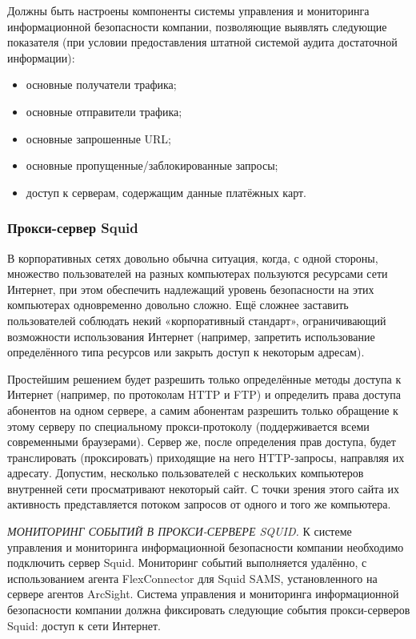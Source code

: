 Должны быть настроены компоненты системы управления и мониторинга информационной безопасности компании, позволяющие выявлять следующие показателя (при условии предоставления штатной системой аудита достаточной информации):
\begin{itemize}
    \newpage
    \item основные получатели трафика;
    \item основные отправители трафика;
    \item основные запрошенные URL;
    \item основные пропущенные/заблокированные запросы;
    \item доступ к серверам, содержащим данные платёжных карт.
\end{itemize}

\subsubsection{Прокси-сервер Squid}
В корпоративных сетях довольно обычна ситуация, когда, с одной стороны, множество пользователей на разных компьютерах пользуются ресурсами сети Интернет, при этом обеспечить надлежащий уровень безопасности на этих компьютерах одновременно довольно сложно. Ещё сложнее заставить пользователей соблюдать некий «корпоративный стандарт», ограничивающий возможности использования Интернет (например, запретить использование определённого типа ресурсов или закрыть доступ к некоторым адресам).

Простейшим решением будет разрешить только определённые методы доступа к Интернет (например, по протоколам HTTP и FTP) и определить права доступа абонентов на одном сервере, а самим абонентам разрешить только обращение к этому серверу по специальному прокси-протоколу (поддерживается всеми современными браузерами). Сервер же, после определения прав доступа, будет транслировать (проксировать) приходящие на него HTTP-запросы, направляя их адресату. Допустим, несколько пользователей с нескольких компьютеров внутренней сети просматривают некоторый сайт. С точки зрения этого сайта их активность представляется потоком запросов от одного и того же компьютера.

\textit{МОНИТОРИНГ СОБЫТИЙ В ПРОКСИ-СЕРВЕРЕ SQUID.}
К системе управления и мониторинга информационной безопасности компании необходимо подключить сервер Squid. Мониторинг событий выполняется удалённо, с использованием агента FlexConnector для Squid SAMS, установленного на сервере агентов ArcSight.
Система управления и мониторинга информационной безопасности компании должна фиксировать следующие события прокси-серверов Squid: доступ к сети Интернет.

